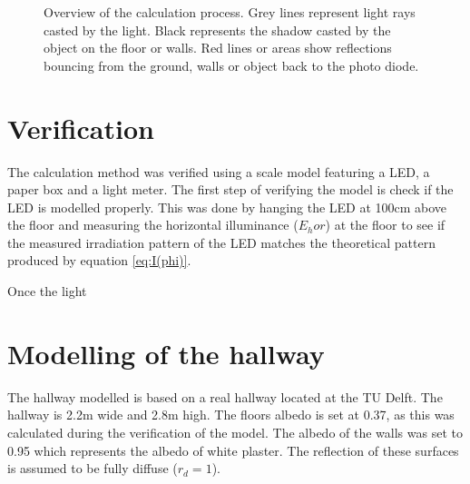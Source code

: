 \begin{figure}
	\centering     %
	\label{fig:raytracing}
	\caption{Overview of the calculation process. Grey lines represent light rays casted by the light. Black represents the shadow casted by the object on the floor or walls. Red lines or areas show reflections bouncing from the ground, walls or object back to the photo diode.}
\end{figure}

\section{Verification}
\label{sec:verification}
The calculation method was verified using a scale model featuring a LED\cite{lamptest}, a paper box and a light meter\cite{LuxMeter}. The first step of verifying the model is check if the LED is modelled properly. This was done by hanging the LED at 100cm above the floor and measuring the horizontal illuminance ($E_hor$) at the floor to see if the measured irradiation pattern of the LED matches the theoretical pattern produced by equation \ref{eq:I(phi)}. 

Once the light 

\section{Modelling of the hallway}
\label{sec:moddelingofthehallway}
The hallway modelled is based on a real hallway located at the TU Delft. The hallway is 2.2m wide and 2.8m high. The floors albedo is set at 0.37, as this was calculated during the verification of the model. The albedo of the walls was set to 0.95 which represents the albedo of white plaster\cite{Albedo}. The reflection of these surfaces is assumed to be fully diffuse ($r_d = 1$).

